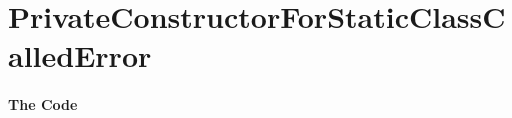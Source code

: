 \section{PrivateConstructorForStaticClassCalledError}\label{code:PrivateConstructorForStaticClassCalledError}

\autocite{TQUADRAT_ORG_FOUNDATION_PRIVATECONSTRUCTORFORSTATICCLASSCALLEDERROR}


\paragraph{The Code}\




